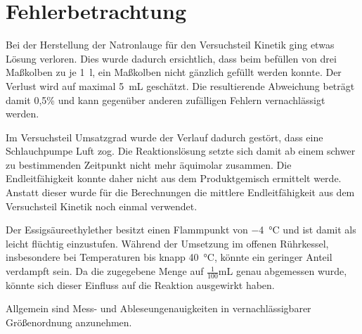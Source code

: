 \section{Fehlerbetrachtung}
\label{sec:fehler}

Bei der Herstellung der Natronlauge für den Versuchsteil Kinetik ging etwas Lösung verloren. Dies wurde dadurch ersichtlich, dass beim befüllen von drei Maßkolben zu je \SI{1}{\litre}, ein Maßkolben nicht gänzlich gefüllt werden konnte. Der Verlust wird auf maximal \SI{5}{\milli\liter} geschätzt. Die resultierende Abweichung beträgt damit 0,5\% und kann gegenüber anderen zufälligen Fehlern vernachlässigt werden. 

Im Versuchsteil Umsatzgrad wurde der Verlauf dadurch gestört, dass eine Schlauchpumpe Luft zog. Die Reaktionslösung setzte sich damit ab einem schwer zu bestimmenden Zeitpunkt nicht mehr äquimolar zusammen. Die Endleitfähigkeit konnte daher nicht aus dem Produktgemisch ermittelt werde. Anstatt dieser wurde für die Berechnungen die mittlere Endleitfähigkeit aus dem Versuchsteil Kinetik noch einmal verwendet. 

Der Essigsäureethylether besitzt einen Flammpunkt von \SI{-4}{\degreeCelsius} und ist damit als leicht flüchtig einzustufen. Während der Umsetzung im offenen Rührkessel, insbesondere bei Temperaturen bis knapp \SI{40}{\degreeCelsius}, könnte ein geringer Anteil verdampft sein. Da die zugegebene Menge auf $\frac{1}{100}$\si{\milli\liter} genau abgemessen wurde, könnte sich dieser Einfluss auf die Reaktion ausgewirkt haben.


Allgemein sind Mess- und Ableseungenauigkeiten in vernachlässigbarer Größenordnung anzunehmen.    